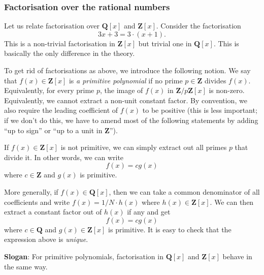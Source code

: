 \documentclass[11pt]{article}
\begin{document}
\subsubsection{Factorisation over the rational numbers}
\label{sec:org0897dbc}
Let us relate factorisation over \(\mathbf{Q}[x]\) and \(\mathbf{Z}[x]\).
Consider the factorisation
\[ 3x+3 = 3 \cdot (x+1).\]
This is a non-trivial factorisation in \(\mathbf{Z}[x]\) but trivial one in \(\mathbf{Q}[x]\).
This is basically the only difference in the theory.

To get rid of factorisations as above, we introduce the following notion.
We say that \(f(x) \in \mathbf{Z}[x]\) is \emph{a primitive polynomial} if no prime \(p \in \mathbf{Z}\) divides \(f(x)\).
Equivalently, for every prime \(p\), the image of \(f(x)\) in \(\mathbf{Z}/p \mathbf{Z}[x]\) is non-zero.
Equivalently, we cannot extract a non-unit constant factor.
By convention, we also require the leading coefficient of \(f(x)\) to be positive (this is less important; if we don't do this, we have to amend most of the following statements by adding ``up to sign'' or ``up to a unit in \(\mathbf{Z}\)'').

If \(f(x)\in \mathbf{Z}[x]\) is not primitive, we can simply extract out all primes \(p\) that divide it.
In other words, we can write
\[ f(x) = c g(x)\]
where \(c \in \mathbf{Z}\) and \(g(x)\) is primitive.

More generally, if \(f(x) \in \mathbf{Q}[x]\), then we can take a common denominator of all coefficients and write \(f(x) = 1/N \cdot h(x)\) where \(h(x) \in \mathbf{Z}[x]\).
We can then extract a constant factor out of \(h(x)\) if any and get
\[ f(x) = c g(x) \]
where \(c \in \mathbf{Q}\) and \(g(x) \in \mathbf{Z}[x]\) is primitive.
It is easy to check that the expression above is \emph{unique}.

\textbf{Slogan}: For primitive polynomials, factorisation in \(\mathbf{Q}[x]\) and \(\mathbf{Z}[x]\) behave in the same way.
\end{document}
